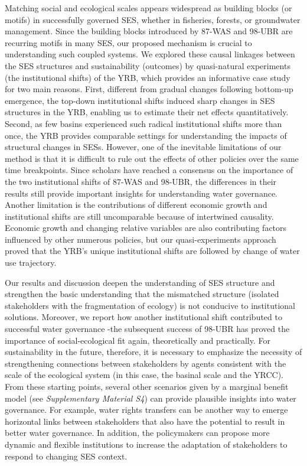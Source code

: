 Matching social and ecological scales appears widespread as building blocks (or motifs) in successfully governed SES, whether in fisheries, forests, or groundwater management.
Since the building blocks introduced by 87-WAS and 98-UBR are recurring motifs in many SES, our proposed mechanism is crucial to understanding such coupled systems.
We explored these causal linkages between the SES structures and sustainability (outcomes) by quasi-natural experiments (the institutional shifts) of the YRB, which provides an informative case study for two main reasons.
First, different from gradual changes following bottom-up emergence, the top-down institutional shifts induced sharp changes in SES structures in the YRB, enabling us to estimate their net effects quantitatively.
Second, as few basins experienced such radical institutional shifts more than once, the YRB provides comparable settings for understanding the impacts of structural changes in SESs.
However, one of the inevitable limitations of our method is that it is difficult to rule out the effects of other policies over the same time breakpoints.
Since scholars have reached a consensus on the importance of the two institutional shifts of 87-WAS and 98-UBR, the differences in their results still provide important insights for understanding water governance.
Another limitation is the contributions of different economic growth and institutional shifts are still uncomparable because of intertwined causality.
Economic growth and changing relative variables are also contributing factors influenced by other numerous policies, but our quasi-experiments approach proved that the YRB's unique institutional shifts are followed by change of water use trajectory.

Our results and discussion deepen the understanding of SES structure and strengthen the basic understanding that the mismatched structure (isolated stakeholders with the fragmentation of ecology) is not conducive to institutional solutions.
Moreover, we report how another institutional shift contributed to successful water governance  -the subsequent success of 98-UBR has proved the importance of social-ecological fit again, theoretically and practically.
For sustainability in the future, therefore, it is necessary to emphasize the necessity of strengthening connections between stakeholders by agents consistent with the scale of the ecological system (in this case, the basinal scale and the YRCC).
From these starting points, several other scenarios given by a marginal benefit model (see \textit{Supplementary Material S4}) can provide plausible insights into water governance.
For example, water rights transfers can be another way to emerge horizontal links between stakeholders that also have the potential to result in better water governance.
In addition, the policymakers can propose more dynamic and flexible institutions to increase the adaptation of stakeholders to respond to changing SES context.

